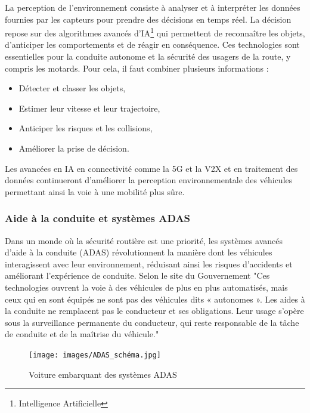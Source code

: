 
La perception de l'environnement consiste à analyser et à interpréter les données fournies par les capteurs pour prendre des décisions en temps réel. La décision repose sur des algorithmes avancés d'IA\footnote{Intelligence Artificielle} qui permettent de reconnaître les objets, d'anticiper les comportements et de réagir en conséquence. Ces technologies sont essentielles pour la conduite autonome et la sécurité des usagers de la route, y compris les motards.
Pour cela, il faut combiner plusieurs informations :
\begin{itemize}
    \item Détecter et classer les objets,
    \item Estimer leur vitesse et leur trajectoire,
    \item Anticiper les risques et les collisions,
    \item Améliorer la prise de décision.
\end{itemize}
Les avancées en IA en connectivité comme la 5G et la V2X et en traitement des données continueront d’améliorer la perception environnementale des véhicules permettant ainsi la voie à une mobilité plus sûre.

\subsubsection{Aide à la conduite et systèmes ADAS}
Dans un monde où la sécurité routière est une priorité, les systèmes avancés d’aide à la conduite (ADAS) révolutionnent la manière dont les véhicules interagissent avec leur environnement, réduisant ainsi les risques d’accidents et améliorant l’expérience de conduite.
Selon le site du Gouvernement \cite{adas_gouv} "Ces technologies ouvrent la voie à des véhicules de plus en plus automatisés, mais ceux qui en sont équipés ne sont pas des véhicules dits « autonomes ». Les aides à la conduite ne remplacent pas le conducteur et ses obligations. Leur usage s’opère sous la surveillance permanente du conducteur, qui reste responsable de la tâche de conduite et de la maîtrise du véhicule."
\begin{figure}[H]
    \centering
    \texttt{[image: images/ADAS\_schéma.jpg]} 
    \caption{Voiture embarquant des systèmes ADAS\cite{continental_adas}}
\end{figure}


